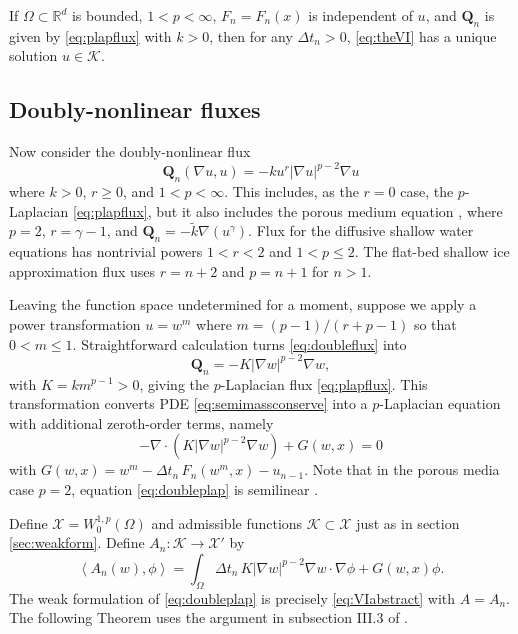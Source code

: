 \documentclass[final,onefignum]{siamart190516}
\newcommand\bQ{\mathbf{Q}}
\newcommand{\Div}{\nabla\cdot}
\newcommand{\grad}{\nabla}
\newcommand{\ip}[2]{\ensuremath{\left<#1,#2\right>}}
\newcommand\RR{\mathbb{R}}
\begin{document}
\begin{theorem}  \label{thm:plapwellposed}  If $\Omega\subset \RR^d$ is bounded, $1<p<\infty$, $F_n=F_n(x)$ is independent of $u$, and $\bQ_n$ is given by \eqref{eq:plapflux} with $k>0$, then for any $\Delta t_n>0$, \eqref{eq:theVI} has a unique solution $u\in\mathcal{K}$.
\end{theorem}

\subsection{Doubly-nonlinear fluxes} \label{subsec:powertransform}  Now consider the doubly-nonlinear flux
\begin{equation}
  \bQ_n(\grad u,u) = - k u^r |\grad u|^{p-2} \grad u \label{eq:doubleflux}
\end{equation}
where $k>0$, $r\ge 0$, and $1<p<\infty$.  This includes, as the $r=0$ case, the $p$-Laplacian \eqref{eq:plapflux}, but it also includes the porous medium equation \cite{Vazquez2007}, where $p=2$, $r=\gamma-1$, and $\bQ_n = - \tilde k \grad(u^\gamma)$.  Flux for the diffusive shallow water equations \cite{AlonsoSantillanaDawson2008} has nontrivial powers $1<r<2$ and $1<p\le 2$.  The flat-bed shallow ice approximation \cite{Calvoetal2002} flux uses $r=n+2$ and $p=n+1$ for $n>1$.

Leaving the function space undetermined for a moment, suppose we apply a power transformation $u = w^m$ where $m = (p-1)/(r+p-1)$ \cite{Raviart1970} so that $0 < m \le 1$.  Straightforward calculation turns \eqref{eq:doubleflux} into
\begin{equation}
	\bQ_n = - K |\grad w|^{p-2} \grad w, \label{eq:doublenewflux}
\end{equation}
with $K=k m^{p-1}>0$, giving the $p$-Laplacian flux \eqref{eq:plapflux}.  This transformation converts PDE \eqref{eq:semimassconserve} into a $p$-Laplacian equation with additional zeroth-order terms, namely
\begin{equation}
    - \Div\left(K|\grad w|^{p-2} \grad w\right) + G(w,x) = 0  \label{eq:doubleplap}
\end{equation}
with $G(w,x) = w^m - \Delta t_n\, F_n(w^m,x) - u_{n-1}$.  Note that in the porous media case $p=2$, equation \eqref{eq:doubleplap} is semilinear \cite{Evans2010}.

Define $\mathcal{X} = W_0^{1,p}(\Omega)$ and admissible functions $\mathcal{K}\subset \mathcal{X}$ just as in section \ref{sec:weakform}.  Define $A_n: \mathcal{K} \to \mathcal{X}'$ by
\begin{equation}
\ip{A_n(w)}{\phi} = \int_\Omega \Delta t_n\, K |\grad w|^{p-2} \grad w\cdot \grad \phi + G(w,x)\phi. \label{eq:doubleform}
\end{equation}
The weak formulation of \eqref{eq:doubleplap} is precisely \eqref{eq:VIabstract} with $A=A_n$.  The following Theorem uses the argument in subsection III.3 of \cite{KinderlehrerStampacchia1980}.
\end{document}
